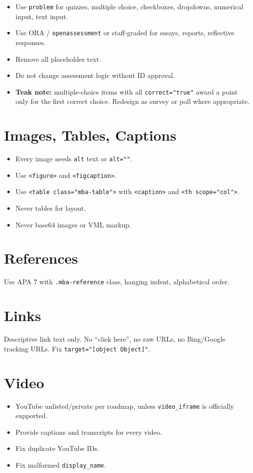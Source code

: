 \begin{itemize}
  \item Use \texttt{problem} for quizzes, multiple choice, checkboxes,
        dropdowns, numerical input, text input.
  \item Use ORA / \texttt{openassessment} or staff-graded for essays,
        reports, reflective responses.
  \item Remove all placeholder text.
  \item Do not change assessment logic without ID approval.
  \item \textbf{Teak note:} multiple-choice items with all
        \texttt{correct="true"} award a point only for the first
        correct choice. Redesign as survey or poll where appropriate.
\end{itemize}

\section{Images, Tables, Captions}

\begin{itemize}
  \item Every image needs \texttt{alt} text or \texttt{alt=""}.
  \item Use \texttt{<figure>} and \texttt{<figcaption>}.
  \item Use \texttt{<table class="mba-table">} with \texttt{<caption>}
        and \texttt{<th scope="col">}.
  \item Never tables for layout.
  \item Never base64 images or VML markup.
\end{itemize}

\section{References}

Use APA 7 with \texttt{.mba-reference} class, hanging indent,
alphabetical order.

\section{Links}

Descriptive link text only. No ``click here'', no raw URLs, no
Bing/Google tracking URLs. Fix \texttt{target="[object Object]"}.

\section{Video}

\begin{itemize}
  \item YouTube unlisted/private per roadmap, unless \texttt{video\_iframe}
        is officially supported.
  \item Provide captions and transcripts for every video.
  \item Fix duplicate YouTube IDs.
  \item Fix malformed \texttt{display\_name}.
\end{itemize}